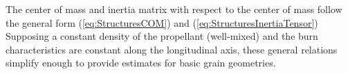 \documentclass[11pt,dvipsnames]{thesis}
\begin{document}
The center of mass and inertia matrix with respect to the center of mass follow the general form (\ref{eq:StructuresCOM}) and (\ref{eq:StructuresInertiaTensor})
Supposing a constant density of the propellant (well-mixed) and the burn characteristics are constant along the longitudinal axis, these general relations simplify enough to provide estimates for basic grain geometries.
\end{document}
